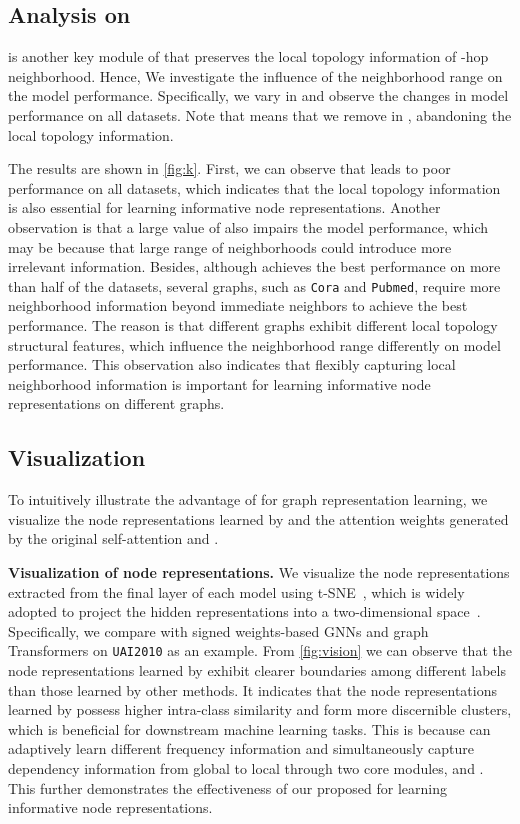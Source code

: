 \documentclass[sigconf, screen]{acmart}
\begin{document}
\subsection{Analysis on  \sffn}
\sffn is another key module of \name that preserves the local topology information of -hop neighborhood.
Hence, We investigate the influence of the neighborhood range  on the model performance.
Specifically, we vary  in  and observe the changes in model performance on all datasets.
Note that  means that we remove \sffn in \name, abandoning the local topology information.

The results are shown in \autoref{fig:k}.
First, we can observe that  leads to poor performance on all datasets, which indicates that the local topology information is also essential for learning informative node representations.
Another observation is that a large value of  also impairs the model performance, which may be because that large range of neighborhoods could introduce more irrelevant information. 
Besides, although  achieves the best performance on more than half of the datasets, several graphs, such as \texttt{Cora} and \texttt{Pubmed}, require more neighborhood information beyond immediate neighbors to achieve the best performance.
The reason is that different graphs exhibit different local topology structural features, which influence the neighborhood range differently on model performance.
This observation also indicates that flexibly capturing local neighborhood information is important for learning informative node representations on different graphs.


\subsection{Visualization}
To intuitively illustrate the advantage of \name for graph representation learning, we visualize the node representations learned by \name and the attention weights generated by the original self-attention and \saname.

\textbf{Visualization of node representations.}
We visualize the node representations extracted from the final layer of each model using t-SNE~\cite{tsne}, which is widely adopted to project the hidden representations into a two-dimensional space~\cite{bmgcn}.
Specifically, we compare \name with signed weights-based GNNs and graph Transformers on \texttt{UAI2010} as an example.
From \autoref{fig:vision} we can observe that the node representations learned by \name exhibit clearer boundaries among different labels than those learned by other methods.
It indicates that the node representations learned by \name possess higher intra-class similarity and form more discernible clusters, which is beneficial for downstream machine learning tasks.
This is because \name can adaptively learn different frequency information and simultaneously capture dependency information from global to local through two core modules, \saname and \sffn.
This further demonstrates the effectiveness of our proposed \name for learning informative node representations.
\end{document}
